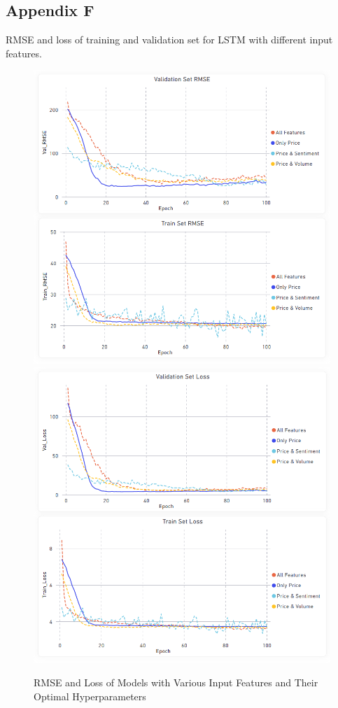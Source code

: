 \documentclass[11pt, a4paper]{article}
\begin{document}
\subsection{Appendix F}
\label{appendix:lstm_models_rmse_loss}
RMSE and loss of training and validation set for LSTM with different input features.
\begin{figure}[!hb]
    \centering
    \includegraphics[scale = 0.4]{Best_Params_Of_Model_RMSE.png}
    \includegraphics[scale = 0.4]{Best_Params_Of_Model_Loss.png}
    \caption{RMSE and Loss of Models with Various Input Features and Their Optimal Hyperparameters}
    \label{fig:lstm_models_rmse_loss}
\end{figure}
\end{document}
